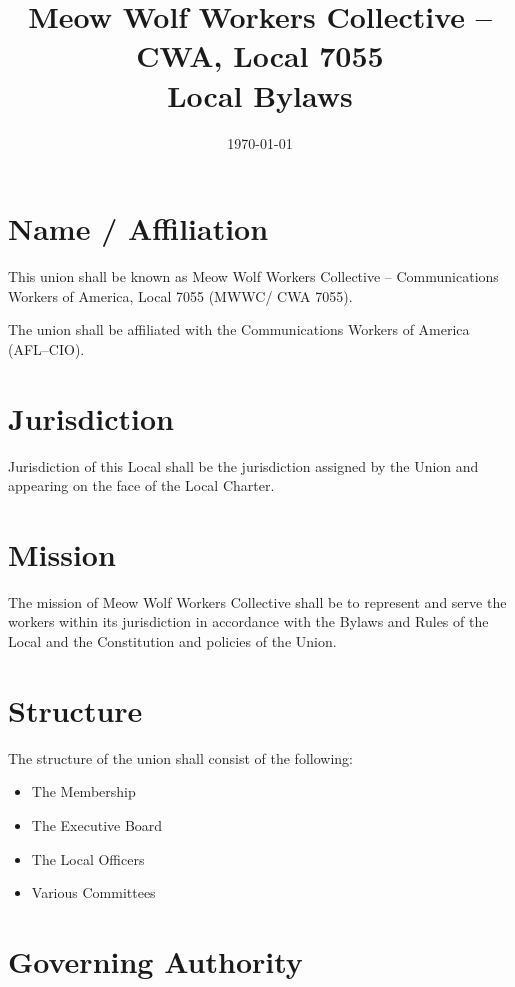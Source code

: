 \documentclass[11pt]{article}
\title{Meow Wolf Workers Collective \--- CWA, Local 7055 \\ Local Bylaws}
\date{\today}
\begin{document}
\maketitle

\tableofcontents
{}
\newpage

\section{Name / Affiliation}
This union shall be known as Meow Wolf Workers Collective – Communications Workers of America, Local 7055 (MWWC/ CWA 7055).

The union shall be affiliated with the Communications Workers of America (AFL–CIO).

\section{Jurisdiction}
Jurisdiction of this Local shall be the jurisdiction assigned by the Union and appearing on the face of the Local Charter.

\section{Mission}
The mission of Meow Wolf Workers Collective shall be to represent and serve the workers within its jurisdiction in accordance with the Bylaws and Rules of the Local and the Constitution and policies of the Union.

\section{Structure}
The structure of the union shall consist of the following:

\begin{itemize}
\item The Membership
\item The Executive Board
\item The Local Officers
\item Various Committees
\end{itemize}

\section{Governing Authority}
\end{document}
